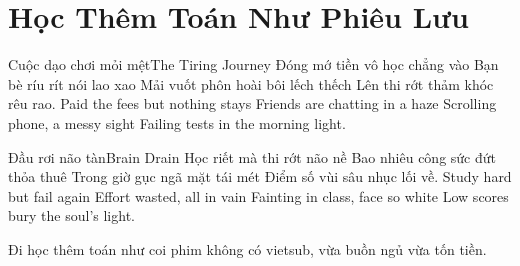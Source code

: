 \chapter{Học Thêm Toán Như Phiêu Lưu}

\begin{tutuyetbox}{Cuộc dạo chơi mỏi mệt}{The Tiring Journey}
Đóng mớ tiền vô học chẳng vào
Bạn bè ríu rít nói lao xao
Mải vuốt phôn hoài bôi lếch thếch
Lên thi rớt thảm khóc rêu rao.
\tcblower
Paid the fees but nothing stays 
Friends are chatting in a haze 
Scrolling phone, a messy sight 
Failing tests in the morning light.
\end{tutuyetbox}

\begin{tutuyetbox}{Đầu rơi não tàn}{Brain Drain}
Học riết mà thi rớt não nề
Bao nhiêu công sức đứt thỏa thuê
Trong giờ gục ngã mặt tái mét
Điểm số vùi sâu nhục lối về.
\tcblower
Study hard but fail again 
Effort wasted, all in vain 
Fainting in class, face so white 
Low scores bury the soul's light.
\end{tutuyetbox}

\begin{ghichu}
Đi học thêm toán như coi phim không có vietsub, vừa buồn ngủ vừa tốn tiền.
\end{ghichu}